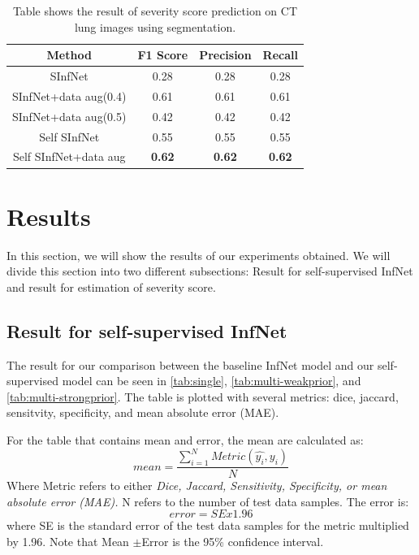 \begin{table}
	\begin{tabular}{|c||c|c|c|}
	\hline
	Method & F1 Score & Precision & Recall \\ \hline
	SInfNet & 0.28 & 0.28 & 0.28 \\ \hline
	SInfNet+data aug(0.4) & 0.61 & 0.61 & 0.61 \\ \hline
	SInfNet+data aug(0.5) & 0.42 & 0.42 & 0.42 \\ \hline
	Self SInfNet & 0.55 & 0.55 & 0.55 \\ \hline
	Self SInfNet+data aug & \textbf{0.62} & \textbf{0.62} & \textbf{0.62} \\ \hline
	\end{tabular}
	\caption{Table shows the result of severity score prediction on CT lung images using segmentation.}
	\label{tab:severity}
\end{table}

\section{Results}
In this section, we will show the results of our experiments obtained. We will divide this section into two different subsections: Result for self-supervised InfNet and result for estimation of severity score.

\subsection{Result for self-supervised InfNet}
 The result for our comparison between the baseline InfNet model and our self-supervised model can be seen in \ref{tab:single}, \ref{tab:multi-weakprior}, and \ref{tab:multi-strongprior}. The table is plotted with  several metrics: dice, jaccard, sensitvity, specificity, and mean absolute error (MAE). 
 
 For the table that contains mean and error, the mean are calculated as:
 \begin{equation}
mean =  \frac{\sum_{i=1}^{N}Metric(\hat{y_i}, y_i)}{N}
 \end{equation}
 Where Metric refers to either \textit{Dice, Jaccard, Sensitivity, Specificity, or mean absolute error (MAE).} N refers to the number of test data samples.
 The error is:
 \begin{equation}
error =  SE x 1.96
 \end{equation}
 where SE is the standard error of the test data samples for the metric multiplied by 1.96.
Note that Mean $\pm$Error is the 95\% confidence interval.
 
